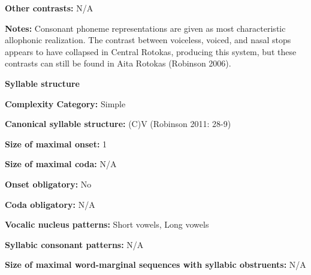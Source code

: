 \begin{styleBody}
\textbf{Other contrasts:} N/A
\end{styleBody}

\begin{styleBody}
\textbf{Notes:} Consonant phoneme representations are given as most characteristic allophonic realization. The contrast between voiceless, voiced, and nasal stops appears to have collapsed in Central Rotokas, producing this system, but these contrasts can still be found in Aita Rotokas (Robinson 2006).
\end{styleBody}

\begin{styleBody}
\textbf{Syllable structure}
\end{styleBody}

\begin{styleBody}
\textbf{Complexity Category:} Simple
\end{styleBody}

\begin{styleBody}
\textbf{Canonical syllable structure:} (C)V\textbf{ }(Robinson 2011: 28-9)
\end{styleBody}

\begin{styleBody}
\textbf{Size of maximal onset:} 1
\end{styleBody}

\begin{styleBody}
\textbf{Size of maximal coda:} N/A
\end{styleBody}

\begin{styleBody}
\textbf{Onset obligatory:} No
\end{styleBody}

\begin{styleBody}
\textbf{Coda obligatory:} N/A
\end{styleBody}

\begin{styleBody}
\textbf{Vocalic nucleus patterns:} Short vowels, Long vowels
\end{styleBody}

\begin{styleBody}
\textbf{Syllabic consonant patterns:} N/A
\end{styleBody}

\begin{styleBody}
\textbf{Size of maximal word{}-marginal sequences with syllabic obstruents:} N/A
\end{styleBody}

